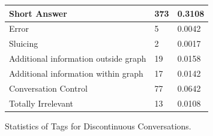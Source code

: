 \documentclass[bsc,frontabs,twoside,singlespacing,parskip,deptreport]{infthesis}     %
\begin{document}
\begin{minipage}{\textwidth}
\begin{minipage}[t]{0.45\textwidth}
{\begin{tabular}{|l|l|l|}
Short Answer                         & 373    & 0.3108                    \\ \hline
Error                                & 5      & 0.0042                    \\ \hline
Sluicing                             & 2      & 0.0017                    \\ \hline
Additional information outside graph & 19     & 0.0158                    \\ \hline
Additional information within graph  & 17     & 0.0142                    \\ \hline
Conversation Control                 & 77     & 0.0642                    \\ \hline
Totally Irrelevant                   & 13     & 0.0108                    \\ \hline
\end{tabular}%
}
\caption{Statistics of Tags for Discontinuous  Conversations.}
\label{tab:dis}
        \end{minipage}
    \end{minipage}
\end{document}
